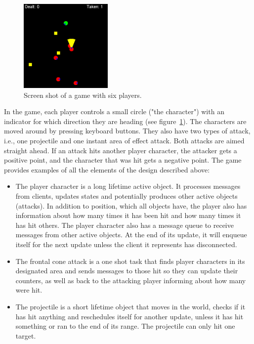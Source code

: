 \begin{figure}
  \vspace{-2mm}
  \includegraphics[width=4.5cm]{FIG/screenshot}
  \caption{Screen shot of a game with six players.}
  \vspace{-2mm}
  \label{fig:screen}
\end{figure}

In the game, each player controls a small circle ("the
character") with an indicator for which direction they are heading
(see figure~\ref{fig:screen}). The
characters are moved around by pressing keyboard buttons. They also
have two types of attack, i.e.,  one projectile and one instant area of effect
attack. Both attacks are aimed straight ahead. If an attack hits
another player character, the attacker gets a positive point, and the
character that was hit gets a negative point. The game
provides examples of all the elements of the design described
above:
\begin{itemize}
\item The player character is a long lifetime active object. It
  processes messages from clients, updates states and potentially
  produces other active objects (attacks). In addition to position,
  which all objects have, the player also has information about how
  many times it has been hit and how many times it has hit others. The
  player character also has a message queue to receive messages from
  other active objects. At the end of its update, it will enqueue
  itself for the next update unless the client it represents has
  disconnected.
\item The frontal cone attack is a one shot task that finds player
  characters in its designated area and sends messages to those hit so
  they can update their counters, as well as back to the attacking
  player informing about how many were hit.
\item The projectile is a short lifetime object that moves in the
  world, checks if it has hit anything and reschedules itself for
  another update, unless it has hit something or ran to the end of its
  range. The projectile can only hit one target.
\end{itemize}

